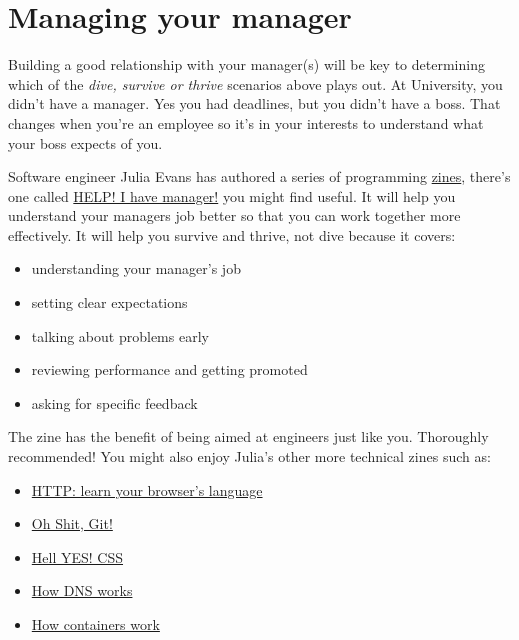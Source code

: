 \documentclass[
]{book}
\providecommand{\tightlist}{%
  \setlength{\itemsep}{0pt}\setlength{\parskip}{0pt}}
\begin{document}
\hypertarget{manager}{%
\section{Managing your manager}\label{manager}}

Building a good relationship with your manager(s) will be key to determining which of the \emph{dive, survive or thrive} scenarios above plays out. At University, you didn't have a manager. Yes you had deadlines, but you didn't have a boss. That changes when you're an employee so it's in your interests to understand what your boss expects of you.

Software engineer Julia Evans has authored a series of programming \href{https://en.wikipedia.org/wiki/Zine}{zines}, there's one called \href{https://wizardzines.com/zines/manager/}{HELP! I have manager!} \citep{helpihaveamanager} you might find useful. It will help you understand your managers job better so that you can work together more effectively. It will help you survive and thrive, not dive because it covers:

\begin{itemize}
\tightlist
\item
  understanding your manager's job
\item
  setting clear expectations
\item
  talking about problems early
\item
  reviewing performance and getting promoted
\item
  asking for specific feedback
\end{itemize}

The zine has the benefit of being aimed at engineers just like you. Thoroughly recommended! You might also enjoy Julia's other more technical zines such as:

\begin{itemize}
\tightlist
\item
  \href{https://wizardzines.com/zines/http/}{HTTP: learn your browser's language} \citep{browserslanguage}
\item
  \href{https://wizardzines.com/zines/oh-shit-git/}{Oh Shit, Git!} \citep{ohshitgit}
\item
  \href{https://wizardzines.com/zines/css/}{Hell YES! CSS} \citep{hellyescss}
\item
  \href{https://wizardzines.com/zines/dns/}{How DNS works} \citep{howdnsworks}
\item
  \href{https://wizardzines.com/zines/containers/}{How containers work} \citep{howcontainerswork}
\end{itemize}
\end{document}
